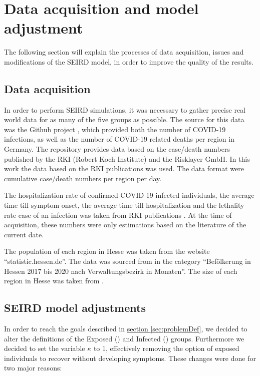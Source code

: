 \section{Data acquisition and model adjustment}
The following section will explain the processes of data acquisition, issues and modifications of the SEIRD model,
in order to improve the quality of the results.

\subsection{Data acquisition}
\label{sec:datacoll}
In order to perform SEIRD simulations, it was necessary to gather precise real world data for as many of the five groups as possible.
The source for this data was the Github project \cite{Gehrcke}, which provided both the number of COVID-19 infections,
as well as the number of COVID-19 related deaths per region in Germany. The repository provides data based on the case/death
numbers published by the RKI (Robert Koch Institute)\cite{RKI} and the Risklayer GmbH. In this work the data based on the RKI publications
was used. The data format were cumulative case/death numbers per region per day.\newline

\par
The hospitalization rate of confirmed COVID-19 infected individuals, the average time till symptom onset, the average time till
hospitalization and the lethality rate case of an infection was taken from RKI publications \cite{RKIcov}. At the time of acquisition, these
numbers were only estimations based on the literature of the current date.\newline

\par
The population of each region in Hesse was taken from the website ``statistic.hessen.de''. The data was sourced from \cite{HessePop}
in the category ``Bef\"olkerung in Hessen 2017 bis 2020 nach Verwaltungsbezirk in Monaten''. The size of each region in Hesse
was taken from \cite{HesseSize}.

\subsection{SEIRD model adjustments}
\label{sec:SEIRDredef}
In order to reach the goals described in \hyperref[sec:problemDef]{section \ref*{sec:problemDef}}, we decided to alter
the definitions of the Exposed () and Infected () groups. Furthermore we decided to set the variable
$\kappa$ to 1, effectively removing the option of exposed individuals to recover without developing symptoms. These
changes were done for two major reasons:\newline

